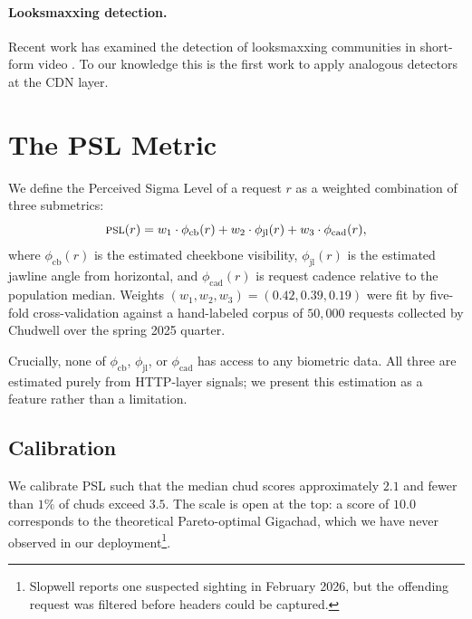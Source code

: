 \documentclass[10pt,twocolumn,letterpaper]{article}
\begin{document}
\paragraph{Looksmaxxing detection.}
Recent work has examined the detection of looksmaxxing communities in
short-form video \cite{tiktok2024lmx, chudwell2025drift}. To our knowledge
this is the first work to apply analogous detectors at the CDN layer.

\section{The PSL Metric}
\label{sec:psl}

We define the Perceived Sigma Level of a request $r$ as a weighted
combination of three submetrics:
\begin{equation}
\textsc{psl}(r) = w_1 \cdot \phi_{\text{cb}}(r) + w_2 \cdot \phi_{\text{jl}}(r) + w_3 \cdot \phi_{\text{cad}}(r),
\end{equation}
where $\phi_{\text{cb}}(r)$ is the estimated cheekbone visibility,
$\phi_{\text{jl}}(r)$ is the estimated jawline angle from horizontal, and
$\phi_{\text{cad}}(r)$ is request cadence relative to the population
median. Weights $(w_1, w_2, w_3) = (0.42, 0.39, 0.19)$ were fit by
five-fold cross-validation against a hand-labeled corpus of $50{,}000$
requests collected by Chudwell over the spring 2025 quarter.

Crucially, none of $\phi_{\text{cb}}$, $\phi_{\text{jl}}$, or
$\phi_{\text{cad}}$ has access to any biometric data. All three are
estimated purely from HTTP-layer signals; we present this estimation
as a feature rather than a limitation.

\subsection{Calibration}
\label{sec:calibration}

We calibrate PSL such that the median chud scores approximately $2.1$ and
fewer than $1\%$ of chuds exceed $3.5$. The scale is open at the top: a
score of $10.0$ corresponds to the theoretical Pareto-optimal Gigachad,
which we have never observed in our deployment\footnote{Slopwell reports
one suspected sighting in February 2026, but the offending request was
filtered before headers could be captured.}.

\end{document}
